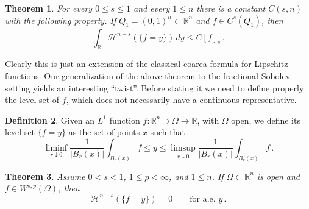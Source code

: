 \documentclass[11pt,reqno]{amsart}
\newtheorem{theorem}{Theorem}[section]
\theoremstyle{definition}
\newtheorem{definition}[theorem]{Definition}
\numberwithin{equation}{section}
\begin{document}
\begin{theorem}\label{t:coarea-Hoelder}
For every $0\leq s \leq 1$ and every $1\leq n$ there is a constant $C(s,n)$ with the following property. If $Q_1 = (0,1)^n\subset \mathbb R^n$ and $f\in C^s (Q_1)$, then 
\begin{equation}\label{e:coarea-Hoelder}
\int_{\mathbb R} \mathcal{H}^{n-s} (\{f=y\})\, dy \leq C [f]_s\, .
\end{equation} 
\end{theorem}

Clearly this is just an extension of the classical coarea formula for Lipschitz functions. Our generalization of the above theorem to the fractional Sobolev setting yields an interesting ``twist''. Before stating it we need to define properly the level set of $f$, which does not necessarily have a continuous representative. 

\begin{definition}\label{d:level-set}
Given an $L^1$ function $f: \mathbb R^n \supset \Omega \to \mathbb R$, with $\Omega$ open, we define its level set $\{f=y\}$ as the set of points $x$ such that 
\[
\liminf_{r\downarrow 0} \frac{1}{|B_r (x)|} \int_{B_r (x)} f \leq y
\leq \limsup_{r\downarrow 0} \frac{1}{|B_r (x)|} \int_{B_r (x)} f \, .
\] 
\end{definition}

\begin{theorem}\label{t:coarea-fractional}
Assume $0<s<1$, $1\leq p < \infty$, and $1\leq n$. If $\Omega\subset \mathbb R^n$ is open and $f\in W^{s,p} (\Omega)$, then
\begin{equation}\label{e:coarea-fractional}
\mathcal{H}^{n-s} (\{f=y\}) = 0 \qquad \mbox{for a.e. $y$}\, .
\end{equation}
\end{theorem}
\end{document}
